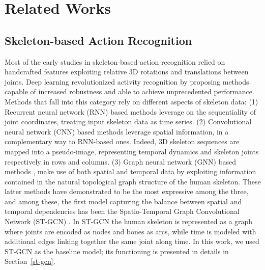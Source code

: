 \documentclass[review]{cvpr}
\begin{document}
\section{Related Works}

\subsection{{Skeleton-based Action Recognition}}{Most of the early studies in skeleton-based action recognition relied on handcrafted features \cite{jointly,points,locations} exploiting relative 3D rotations and translations between joints. Deep learning revolutionized activity recognition by proposing methods capable of increased robustness \cite{a-comparative} and able to achieve unprecedented performance. Methods that fall into this category rely on different aspects of skeleton data: (1) Recurrent neural network (RNN) based methods \cite{Rnn,modeling,global-context,hrnn} leverage on the sequentiality of joint coordinates, treating input skeleton data as time series. (2) Convolutional neural network (CNN) based methods \cite{p-cnn,2s-cnn,investigation,liu2017enhanced,bo} leverage spatial information, in a complementary way to RNN-based ones. Indeed, 3D skeleton sequences are mapped into a pseudo-image, representing temporal dynamics and skeleton joints respectively in rows and columns. (3) Graph neural network (GNN) based methods \cite{yan2018spatial,Shi2018TwoStreamAG,dirgraph}, make use of both spatial and temporal data by exploiting information contained in the natural topological graph structure of the human skeleton. These latter methods have demonstrated to be the most expressive among the three, and among these, the first model capturing the balance between spatial and temporal dependencies has been the Spatio-Temporal Graph Convolutional Network (ST-GCN) \cite{yan2018spatial}. In ST-GCN the human skeleton is represented as a graph where joints are encoded as nodes and bones as arcs, while time is modeled with additional edges linking together the same joint along time. In this work, we used ST-GCN as the baseline model; its functioning is presented in details in Section~\ref{st-gcn}. }
\end{document}
